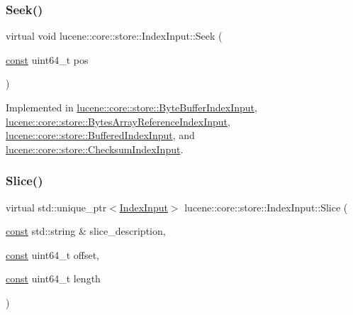 \mbox{\label{classlucene_1_1core_1_1store_1_1IndexInput_ad0eecec90fbbcfe46f881d75105a6046}} 
\subsubsection{\texorpdfstring{Seek()}{Seek()}}
{\footnotesize\ttfamily virtual void lucene\+::core\+::store\+::\+Index\+Input\+::\+Seek (\begin{DoxyParamCaption}\item[{\mbox{\hyperlink{ZlibCrc32_8h_a2c212835823e3c54a8ab6d95c652660e}{const}} uint64\+\_\+t}]{pos }\end{DoxyParamCaption})\hspace{0.3cm}{\ttfamily [pure virtual]}}



Implemented in \mbox{\hyperlink{classlucene_1_1core_1_1store_1_1ByteBufferIndexInput_a738aaa390f9fe7c48006969b857bcc62}{lucene\+::core\+::store\+::\+Byte\+Buffer\+Index\+Input}}, \mbox{\hyperlink{classlucene_1_1core_1_1store_1_1BytesArrayReferenceIndexInput_a89d5954669ecb74ed5a32805581c96d0}{lucene\+::core\+::store\+::\+Bytes\+Array\+Reference\+Index\+Input}}, \mbox{\hyperlink{classlucene_1_1core_1_1store_1_1BufferedIndexInput_a251eb285e9e7b132c543d0d3920007ff}{lucene\+::core\+::store\+::\+Buffered\+Index\+Input}}, and \mbox{\hyperlink{classlucene_1_1core_1_1store_1_1ChecksumIndexInput_a6e16713a71125b9ee2d1407cf2d6c6fb}{lucene\+::core\+::store\+::\+Checksum\+Index\+Input}}.

\mbox{\label{classlucene_1_1core_1_1store_1_1IndexInput_a3a2d71caf506c20d7c866bdcda5e0171}} 
\subsubsection{\texorpdfstring{Slice()}{Slice()}}
{\footnotesize\ttfamily virtual std\+::unique\+\_\+ptr$<$\mbox{\hyperlink{classlucene_1_1core_1_1store_1_1IndexInput}{Index\+Input}}$>$ lucene\+::core\+::store\+::\+Index\+Input\+::\+Slice (\begin{DoxyParamCaption}\item[{\mbox{\hyperlink{ZlibCrc32_8h_a2c212835823e3c54a8ab6d95c652660e}{const}} std\+::string \&}]{slice\+\_\+description,  }\item[{\mbox{\hyperlink{ZlibCrc32_8h_a2c212835823e3c54a8ab6d95c652660e}{const}} uint64\+\_\+t}]{offset,  }\item[{\mbox{\hyperlink{ZlibCrc32_8h_a2c212835823e3c54a8ab6d95c652660e}{const}} uint64\+\_\+t}]{length }\end{DoxyParamCaption})\hspace{0.3cm}{\ttfamily [pure virtual]}}




